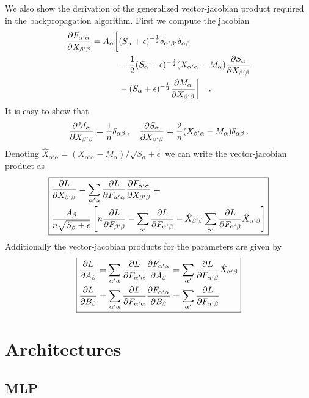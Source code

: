 \documentclass{myclass}
\begin{document}
We also show the derivation of the generalized vector-jacobian product required in the
backpropagation algorithm. First we compute the jacobian
\[
\begin{split}
   \pdv{F_{\alpha'\alpha}}{X_{\beta'\beta}} = A_\alpha \bigg[ 
                                            & (S_\alpha + \epsilon)^{-\frac{1}{2}} \delta_{\alpha'\beta'} \delta_{\alpha\beta} \\
                                            & - \frac{1}{2}(S_\alpha + \epsilon)^{-\frac{3}{2}} (X_{\alpha'\alpha} - M_\alpha) \pdv{S_\alpha}{X_{\beta'\beta}} \\
                                            & - (S_\alpha + \epsilon)^{-\frac{1}{2}} \pdv{M_\alpha}{X_{\beta'\beta}}
                                            \bigg]\quad.
\end{split}
\]
It is easy to show that 
\[
   \pdv{M_\alpha}{X_{\beta'\beta}} = \frac{1}{n} \delta_{\alpha\beta}\,,\quad \pdv{S_\alpha}{X_{\beta'\beta}} = \frac{2}{n}(X_{\beta'\alpha} - M_\alpha) \delta_{\alpha\beta} \,.
\]
Denoting \(\hat{X}_{\alpha'\alpha} = (X_{\alpha'\alpha} - M_\alpha) / \sqrt{S_\alpha + \epsilon}\)
we can write the vector-jacobian product as
\[
\boxed
{
\begin{split}
   &\pdv{L}{X_{\beta'\beta}} = \sum_{\alpha'\alpha} \pdv{L}{F_{\alpha'\alpha}} \pdv{F_{\alpha'\alpha}}{X_{\beta'\beta}} =\\
   &\frac{A_\beta}{n\sqrt{S_\beta + \epsilon}} \left[ n \pdv{L}{F_{\beta'\beta}} - \sum_{\alpha'} \pdv{L}{F_{\alpha'\beta}} - \hat{X}_{\beta'\beta} \sum_{\alpha'} \pdv{L}{F_{\alpha'\beta}} \hat{X}_{\alpha'\beta} \right]
\end{split}
}
\]
Additionally the vector-jacobian products for the parameters are given by
\[
\boxed
{
\begin{split}
   &\pdv{L}{A_\beta} = \sum_{\alpha'\alpha} \pdv{L}{F_{\alpha'\alpha}} \pdv{F_{\alpha'\alpha}}{A_\beta} = \sum_{\alpha'} \pdv{L}{F_{\alpha'\beta}} \hat{X}_{\alpha'\beta}\\
   &\pdv{L}{B_\beta} =  \sum_{\alpha'\alpha} \pdv{L}{F_{\alpha'\alpha}} \pdv{F_{\alpha'\alpha}}{B_\beta} = \sum_{\alpha'} \pdv{L}{F_{\alpha'\beta}}
\end{split}
}
\]

\section{Architectures}

\subsection{MLP}
\end{document}
